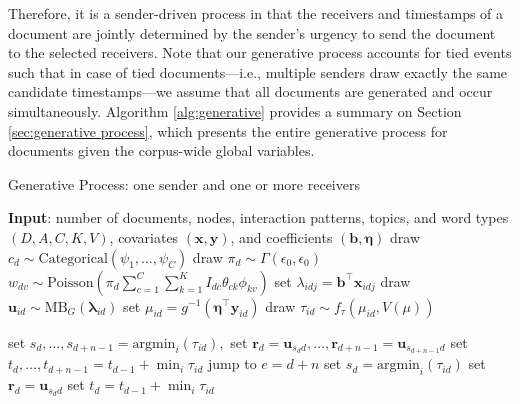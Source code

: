 \documentclass[ba]{imsart}
\def\spacingset#1{\renewcommand{\baselinestretch}%
	{#1}\small\normalsize} \spacingset{1}
\numberwithin{equation}{section}
\theoremstyle{plain}
\begin{document}
		Therefore, it is a sender-driven process in that the receivers and timestamps of a document are jointly determined by the sender's urgency to send the document to the selected receivers. Note that our generative process accounts for tied events such that in case of tied documents---i.e., multiple senders draw exactly the same candidate timestamps---we assume that all documents are generated and occur simultaneously. Algorithm \ref{alg:generative} provides a summary on Section \ref{sec:generative process}, which presents the entire generative process for documents given the corpus-wide global variables.
	\begin{algorithm}[!t]
		\spacingset{1}
		\SetAlgoLined
		\caption{Generative Process: one sender and one or more receivers}
	\begin{algorithmic}
		\STATE \textbf{Input}: number of documents, nodes, interaction patterns, topics, and word types $(D, A, C, K, V)$, covariates $(\boldsymbol{x}, \boldsymbol{y})$, and coefficients $(\boldsymbol{b}, \boldsymbol{\eta})$
		\vskip 0.1in
		\STATE	draw $c_d\sim \mbox{Categorical}(\psi_1,\ldots,{\psi_C})$
		\STATE draw $\pi_{d}\sim \Gamma(\epsilon_0,\epsilon_0)$
		\STATE $w_{dv} \sim \mbox{Poisson}(\pi_{d}\sum_{c=1}^C \sum_{k=1}^K I_{dc} \theta_{ck}\phi_{kv})$
			\ENDFOR
		\STATE	set $\lambda_{idj} = {\boldsymbol{b}}^{\top}\boldsymbol{x}_{idj}$
		\ENDFOR
		\STATE	draw $\boldsymbol{u}_{id}  \sim
		\mbox{MB}_G(\boldsymbol{\lambda}_{id})$
		\STATE		set $\mu_{id} = g^{-1}(\boldsymbol{\eta}^\top \boldsymbol{y}_{id})$
		\STATE		draw $\tau_{id} \sim f_\tau(\mu_{id}, V(\mu))$
		\ENDFOR
		
		\STATE	set $s_d,\ldots, s_{d+n-1}=\mbox{argmin}_{i}(\tau_{id}),$
		\STATE	set $\boldsymbol{r}_d=\boldsymbol{u}_{s_d d},\ldots,\boldsymbol{r}_{d+n-1}=\boldsymbol{u}_{s_{d+n-1} d}$
		\STATE	set $t_d, \ldots, t_{d+n-1}=t_{d-1} + \min_i\tau_{id}$
		\STATE		jump to $e = d+n$
		\ELSE
		\STATE	set $s_d= \mbox{argmin}_{i}(\tau_{id})$
		\STATE		set $\boldsymbol{r}_d= \boldsymbol{u}_{s_d d}$
		\STATE	set $t_d =t_{d-1} + \min_i\tau_{id}$
		\ENDIF
		\ENDFOR
	\end{algorithmic}
		\label{alg:generative}
	\end{algorithm}
	\newpage
\end{document}
